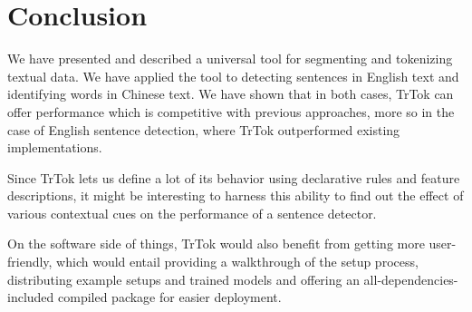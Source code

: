 \section{Conclusion}
\label{sec:outro}

We have presented and described a universal tool for segmenting and
tokenizing textual data. We have applied the tool to detecting
sentences in English text and identifying words in Chinese text. We
have shown that in both cases, TrTok can offer performance which is
competitive with previous approaches, more so in the case of English
sentence detection, where TrTok outperformed existing implementations.

Since TrTok lets us define a lot of its behavior using declarative
rules and feature descriptions, it might be interesting to harness
this ability to find out the effect of various contextual cues on the
performance of a sentence detector.

On the software side of things, TrTok would also benefit from getting
more user-friendly, which would entail providing a walkthrough of the
setup process, distributing example setups and trained models and
offering an all-dependencies-included compiled package for easier
deployment.
